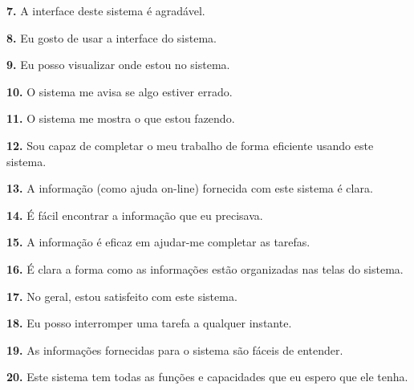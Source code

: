 \textbf{7.} A interface deste sistema é agradável.

\textbf{8.} Eu gosto de usar a interface do sistema.

\textbf{9.} Eu posso visualizar onde estou no sistema.

\textbf{10.} O sistema me avisa se algo estiver errado.

\textbf{11.} O sistema me mostra o que estou fazendo.

\textbf{12.} Sou capaz de completar o meu trabalho de forma eficiente usando este sistema.

\textbf{13.} A informação (como ajuda on-line) fornecida com este sistema é clara.

\textbf{14.} É fácil encontrar a informação que eu precisava.

\textbf{15.} A informação é eficaz em ajudar-me completar as tarefas.

\textbf{16.} É clara a forma como as informações estão organizadas nas telas do sistema.

\textbf{17.} No geral, estou satisfeito com este sistema.

\textbf{18.} Eu posso interromper uma tarefa a qualquer instante.

\textbf{19.} As informações fornecidas para o sistema são fáceis de entender.

\textbf{20.} Este sistema tem todas as funções e capacidades que eu espero que ele tenha.


